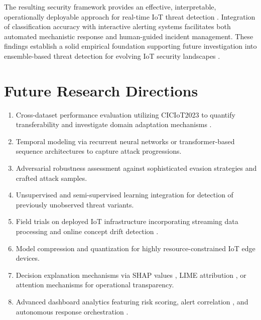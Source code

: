 \documentclass[conference]{IEEEtran}
\begin{document}
The resulting security framework provides an effective, interpretable, operationally deployable approach for real-time IoT threat detection \cite{b1, b2, b3}. Integration of classification accuracy with interactive alerting systems facilitates both automated mechanistic response and human-guided incident management. These findings establish a solid empirical foundation supporting future investigation into ensemble-based threat detection for evolving IoT security landscapes \cite{b11, b14}.

\section*{Future Research Directions}

\begin{enumerate}
\item Cross-dataset performance evaluation utilizing CICIoT2023 \cite{b8} to quantify transferability and investigate domain adaptation mechanisms \cite{b15}.
\item Temporal modeling via recurrent neural networks \cite{b5} or transformer-based sequence architectures \cite{b3} to capture attack progressions.
\item Adversarial robustness assessment \cite{b4} against sophisticated evasion strategies and crafted attack samples.
\item Unsupervised and semi-supervised learning integration \cite{b13} for detection of previously unobserved threat variants.
\item Field trials on deployed IoT infrastructure \cite{b2} incorporating streaming data processing and online concept drift detection \cite{b18}.
\item Model compression and quantization \cite{b14} for highly resource-constrained IoT edge devices.
\item Decision explanation mechanisms via SHAP values \cite{b1}, LIME attribution \cite{b3}, or attention mechanisms for operational transparency.
\item Advanced dashboard analytics featuring risk scoring, alert correlation \cite{b3}, and autonomous response orchestration \cite{b2}.
\end{enumerate}
\end{document}
